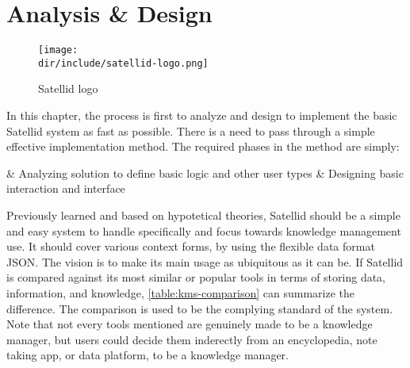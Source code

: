 \chapter{Analysis \& Design}
\label{chap:analysis-design}

\begin{figure}[ht]
  \centering
  \texttt{[image: \\dir/include/satellid-logo.png]}
  \caption{Satellid logo}
  \label{fig:satellid-logo}
\end{figure}

In this chapter, the process is first to analyze and design to implement the basic Satellid system as fast as possible.
There is a need to pass through a simple effective implementation method.
The required phases in the method are simply:

\begin{easylist}
& Analyzing solution to define basic logic and other user types
& Designing basic interaction and interface
\end{easylist}

Previously learned and based on hypotetical theories, Satellid should be a simple and easy system to handle specifically and focus towards knowledge management use.
It should cover various context forms, by using the flexible data format \ac{JSON}.
The vision is to make its main usage as ubiquitous as it can be.
If Satellid is compared against its most similar or popular tools in terms of storing data, information, and knowledge, \autoref{table:kms-comparison} can summarize the difference.
The comparison is used to be the complying standard of the system.
Note that not every tools mentioned are genuinely made to be a knowledge manager, but users could decide them inderectly from an encyclopedia, note taking app, or data platform, to be a knowledge manager.

